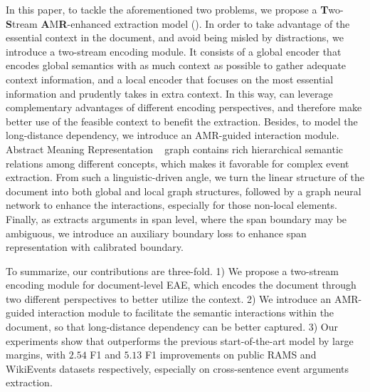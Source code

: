 In this paper, to tackle the aforementioned two problems, we propose a \textbf{T}wo-\textbf{S}tream \textbf{A}M\textbf{R}-enhanced extraction model (\textbf{\modelname}).
In order to take advantage of the essential context in the document, and avoid being misled by distractions, we introduce a two-stream encoding module.
It consists of a global encoder that encodes global semantics with as much context as possible to gather adequate context information, and a local encoder that focuses on the most essential information and prudently takes in extra context.
In this way, \modelname can leverage complementary advantages of different encoding perspectives, and therefore make better use of the feasible context to benefit the extraction.
Besides, to model the long-distance dependency, we introduce an AMR-guided interaction module.
Abstract Meaning Representation ~\cite[AMR,][]{banarescu-etal-2013-abstract} graph contains rich hierarchical semantic relations among different concepts, which makes it favorable for complex event extraction.
From such a linguistic-driven angle, we turn the linear structure of the document into both global and local graph structures, followed by a graph neural network to enhance the interactions, especially for those non-local elements.
Finally, as \modelname extracts arguments in span level, where the span boundary may be ambiguous, we introduce an auxiliary boundary loss to enhance span representation with calibrated boundary.


To summarize, our contributions are three-fold.
1) We propose a two-stream encoding module for document-level EAE, which encodes the document through two different perspectives to better utilize the context.
2) We introduce an AMR-guided interaction module to facilitate the semantic interactions within the document, so that long-distance dependency can be better captured.
3) Our experiments show that \modelname outperforms the previous start-of-the-art model by large margins, with $2.54$ F1 and $5.13$ F1 improvements on public RAMS and WikiEvents datasets respectively, especially on cross-sentence event arguments extraction.
